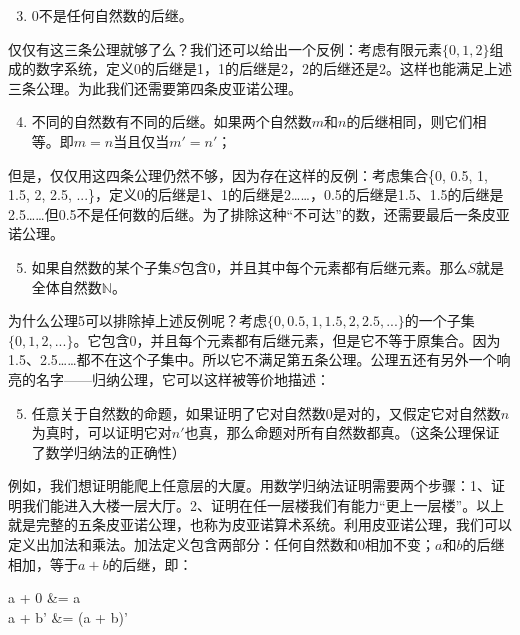\documentclass[b5paper]{ctexart}
\begin{document}
\begin{enumerate}
  \setcounter{enumi}{2}
  \item 0不是任何自然数的后继。
\end{enumerate}

仅仅有这三条公理就够了么？我们还可以给出一个反例：考虑有限元素$\{0, 1, 2\}$组成的数字系统，定义0的后继是1，1的后继是2，2的后继还是2。这样也能满足上述三条公理。为此我们还需要第四条皮亚诺公理。

\begin{enumerate}
  \setcounter{enumi}{3}
  \item 不同的自然数有不同的后继。如果两个自然数$m$和$n$的后继相同，则它们相等。即$m = n$当且仅当$m' = n'$；
\end{enumerate}

但是，仅仅用这四条公理仍然不够，因为存在这样的反例：考虑集合\{0, 0.5, 1, 1.5, 2, 2.5, ...\}，定义0的后继是1、1的后继是2……，0.5的后继是1.5、1.5的后继是2.5……但0.5不是任何数的后继。为了排除这种“不可达”的数，还需要最后一条皮亚诺公理。

\begin{enumerate}
  \setcounter{enumi}{4}
  \item 如果自然数的某个子集$S$包含0，并且其中每个元素都有后继元素。那么$S$就是全体自然数$\mathbb{N}$。
\end{enumerate}

 
为什么公理5可以排除掉上述反例呢？考虑$\{0, 0.5, 1, 1.5, 2, 2.5, ...\}$的一个子集$\{0, 1, 2, ...\}$。它包含0，并且每个元素都有后继元素，但是它不等于原集合。因为1.5、2.5……都不在这个子集中。所以它不满足第五条公理。公理五还有另外一个响亮的名字——归纳公理，它可以这样被等价地描述：

\begin{enumerate}
  \setcounter{enumi}{4}
  \item 任意关于自然数的命题，如果证明了它对自然数0是对的，又假定它对自然数$n$为真时，可以证明它对$n'$也真，那么命题对所有自然数都真。（这条公理保证了数学归纳法的正确性）
\end{enumerate}

例如，我们想证明能爬上任意层的大厦。用数学归纳法证明需要两个步骤：1、证明我们能进入大楼一层大厅。2、证明在任一层楼我们有能力“更上一层楼”。以上就是完整的五条皮亚诺公理，也称为皮亚诺算术系统。利用皮亚诺公理，我们可以定义出加法和乘法。加法定义包含两部分：任何自然数和0相加不变；$a$和$b$的后继相加，等于$a+b$的后继，即：

\be
\begin{laligned}
a + 0  &= a \\
a + b' &= (a + b)'
\end{laligned}
\label{eq:peano-add}
\ee
\end{document}
